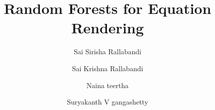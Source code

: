 \documentclass{acm_proc_article-sp}
\begin{document}
\title{Random Forests for Equation Rendering
}

%
%
%
%


%




%

\author[1]{Sai Sirisha Rallabandi}
\author[1]{Sai Krishna Rallabandi}
\author[2]{Naina teertha}
\author[1]{Suryakanth V gangashetty}

\renewcommand\Authands{ and }
\end{document}
